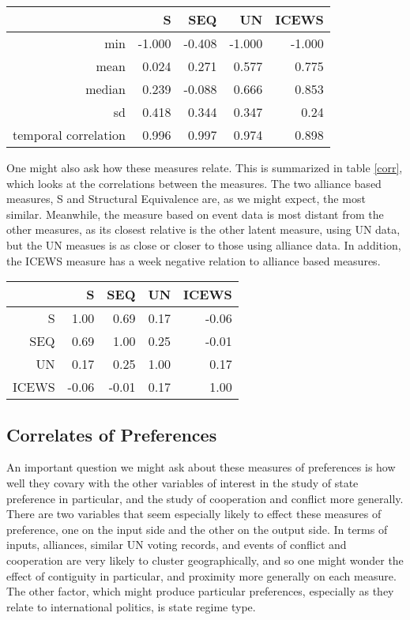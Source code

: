 \documentclass[12pt,onesided,fullpage]{amsart}
\begin{document}
\begin{table}[ht]
\centering
\begin{tabular}{rrrrr}
  \hline
 & S & SEQ & UN & ICEWS \\ 
  \hline
min & -1.000 & -0.408 & -1.000 & -1.000 \\ 
  mean & 0.024 & 0.271 & 0.577 & 0.775 \\ 
  median & 0.239 & -0.088 & 0.666 & 0.853 \\ 
  sd & 0.418 & 0.344 & 0.347 & 0.24 \\ 
  temporal correlation & 0.996 & 0.997 & 0.974 & 0.898 \\ 
   \hline
\end{tabular}
\end{table}



One might also ask how these measures relate. This is summarized in table \ref{corr}, which looks at the correlations between the measures. The two alliance based measures, S and Structural Equivalence are, as we might expect, the most similar. Meanwhile, the measure based on event data is most distant from the other measures, as its closest relative is the other latent measure, using UN data, but the UN measues is as close or closer to those using alliance data. In addition, the ICEWS measure has a week negative relation to alliance based measures.

\begin{table}[ht]
\centering
\begin{tabular}{rrrrr}
  \hline
 & S & SEQ & UN & ICEWS \\ 
  \hline
S & 1.00 & 0.69 & 0.17 & -0.06 \\ 
  SEQ & 0.69 & 1.00 & 0.25 & -0.01 \\ 
  UN & 0.17 & 0.25 & 1.00 & 0.17 \\ 
  ICEWS & -0.06 & -0.01 & 0.17 & 1.00 \\ 
   \hline
\end{tabular}
\end{table}

\subsection{Correlates of Preferences}
An important question we might ask about these measures of preferences is how well they covary with the other variables of interest in the study of state preference in particular, and the study of cooperation and conflict more generally. There are two variables that seem especially likely to effect these measures of preference, one on the input side and the other on the output side. In terms of inputs, alliances, similar UN voting records, and events of conflict and cooperation are very likely to cluster geographically, and so one might wonder the effect of contiguity in particular, and proximity more generally on each measure. The other factor, which might produce particular preferences, especially as they relate to international politics, is state regime type.
\end{document}
